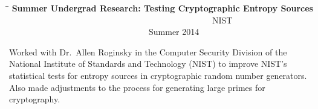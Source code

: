 \documentclass{res}
\begin{document}
\begin{resume}
	\begin{tabbing}
	\hspace{3in}\=  \hspace{1.63in}\= \kill %
	{\bf Summer Undergrad Research: Testing Cryptographic Entropy Sources} \>~~~~~~~~~~~~~~~~~~~~~~~~~~~~~~~~~~~~~~~~~~~~~~~~NIST 
 \>~~~~~~~~~~~~~~~~~~~~~~~~~~~~~~~~~Summer 2014\\      
	\end{tabbing} \vspace{-30pt}
	Worked with Dr.~Allen Roginsky in the Computer Security Division of the National Institute of Standards and Technology (NIST) to improve NIST's statistical tests for entropy sources in cryptographic random number generators.  Also made adjustments to the process for generating large primes for cryptography.
\\







%



%



\end{resume}
\end{document}
